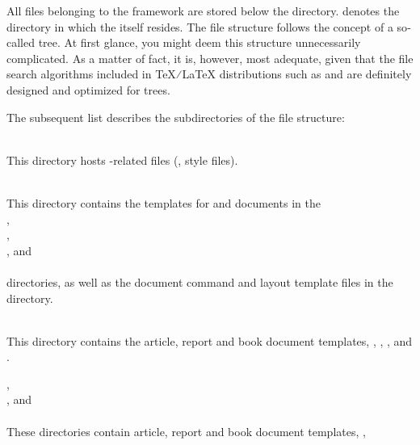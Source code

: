 All files belonging to the \wegcLaTeX{} framework are stored below the
 directory.  denotes
the directory in which the  itself resides.
%
The file structure follows the concept of a so‐called \texmf{} tree. At first
glance, you might deem this structure unnecessarily complicated. As a
matter of fact, it is, however, most adequate, given that the file search
algorithms included in \TeX⁄\LaTeX{} distributions such as \TeXLive{} and
\MiKTeX{} are definitely designed and optimized for \texmf{} trees.

The subsequent list describes the subdirectories of the \wegcLaTeX{} file structure:
\begin{description}
   \item {} \\
      This directory hosts -related files (\EG, style files).
    \item {} \\
      This directory contains the \wegcLaTeX{} templates for
      \singledoc and \multidoc documents in the \\
      , \\
      , \\
      , and \\
       \\
      directories, as well as the document command and layout template files in the \\
       directory.
   \item {} \\
      This directory contains the \singledoc article, report and book document templates, \IE,
      , , and .
   \item {}, \\
         , and \\
           \\
      These directories contain \multidoc article, report and book document templates, \IE, \\

\end{description}
